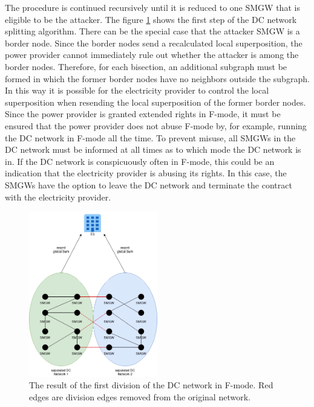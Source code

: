 The procedure is continued recursively until it is reduced to one \gls{SMGW} that is eligible to be the attacker. The figure \ref{fig:FirstSplitting} shows the first step of the DC network splitting algorithm.
There can be the special case that the attacker \gls{SMGW} is a border node. Since the border nodes send a recalculated local superposition, the power provider cannot immediately rule out whether the attacker is among the border nodes. Therefore, for each bisection, an additional subgraph must be formed in which the former border nodes have no neighbors outside the subgraph. In this way it is possible for the electricity provider to control the local superposition when resending the local superposition of the former border nodes. \\
Since the power provider is granted extended rights in F-mode, it must be ensured that the power provider does not abuse F-mode by, for example, running the DC network in F-mode all the time. To prevent misuse, all \gls{SMGW}s in the DC network must be informed at all times as to which mode the DC network is in. If the DC network is conspicuously often in F-mode, this could be an indication that the electricity provider is abusing its rights. In this case, the \gls{SMGW}s have the option to leave the DC network and terminate the contract with the electricity provider.
\begin{figure}[tbp]
  \centering
  \includegraphics[width=0.5\textwidth]{images/DC Net Split.png}
  \caption[DC Network Splitting Algorithm]{The result of the first division of the DC network in F-mode. Red edges are division edges removed from the original network.}
  \label{fig:FirstSplitting}
\end{figure}
